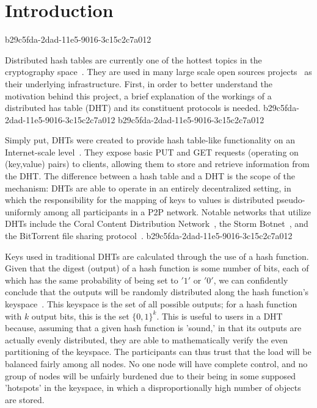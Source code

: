\documentclass[12pt]{article}
\begin{document}
\section{Introduction}
b29c5fda-2dad-11e5-9016-3c15c2c7a012\par Distributed hash tables are currently one of the hottest topics in the cryptography space~\cite{Stoica:2001dj,Rowstron:2001ea,Ratnasamy:2001wn}. They are used in many large scale open sources projects~\cite{Freitas:2013tb,Xu:2010vs,Perfitt:2010fh} as their underlying infrastructure. First, in order to better understand the motivation behind this project, a brief explanation of the workings of a distributed has table (DHT) and its constituent protocols is needed.
b29c5fda-2dad-11e5-9016-3c15c2c7a012
b29c5fda-2dad-11e5-9016-3c15c2c7a012\par Simply put, DHTs were created to provide hash table-like functionality on an Internet-scale level~\cite{Ratnasamy:2001wn}. They expose basic PUT and GET requests (operating on (key,value) pairs) to clients, allowing them to store and retrieve information from the DHT. The difference between a hash table and a DHT is the scope of the mechanism: DHTs are able to operate in an entirely decentralized setting, in which the responsibility for the mapping of keys to values is distributed pseudo-uniformly among all participants in a P2P network. Notable networks that utilize DHTs include the Coral Content Distribution Network~\cite{Freedman:2004vb}, the Storm Botnet~\cite{Holz:2008uk}, and the BitTorrent file sharing protocol~\cite{Cohen:y1_8mBnw}.
b29c5fda-2dad-11e5-9016-3c15c2c7a012
\par Keys used in traditional DHTs are calculated through the use of a hash function. Given that the digest (output) of a hash function is some number of bits, each of which has the same probability of being set to $'1'$ or $'0'$, we can confidently conclude that the outputs will be randomly distributed along the hash function's keyspace~. This keyspace is the set of all possible outputs; for a hash function with $k$ output bits, this is the set $\{0,1\}^k$. This is useful to users in a DHT because, assuming that a given hash function is 'sound,' in that its outputs are actually evenly distributed, they are able to mathematically verify the even partitioning of the keyspace. The participants can thus trust that the load will be balanced fairly among all nodes. No one node will have complete control, and no group of nodes will be unfairly burdened due to their being in some supposed 'hotspots' in the keyspace, in which a disproportionally high number of objects are stored.~
\end{document}
